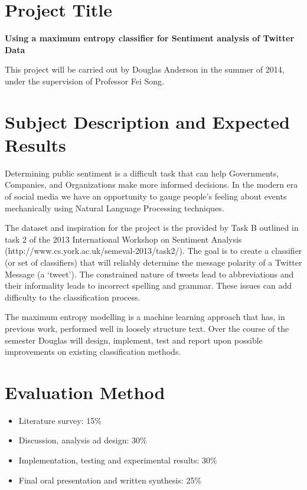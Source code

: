 \documentclass{article}
\begin{document}
\large
\thispagestyle{empty}

\section*{Project Title}

{\bf Using a maximum entropy classifier for Sentiment analysis of Twitter Data}

\quad

This project will be carried out by Douglas Anderson in the summer of 2014,
under the supervision of Professor Fei Song.

\section*{Subject Description and Expected Results}

Determining public sentiment is a difficult task that can help Governments,
Companies, and Organizations make more informed decisions. In the modern era of
social media we have an opportunity to gauge people's feeling about events
mechanically using Natural Language Processing techniques.

The dataset and inspiration for the project is the provided by Task B outlined
in task 2 of the 2013 International Workshop on Sentiment Analysis
(http://www.cs.york.ac.uk/semeval-2013/task2/). The goal is to create a
classifier (or set of classifiers) that will reliably determine the message
polarity of a Twitter Message (a `tweet'). The constrained nature of tweets
lead to abbreviations and their informality leads to incorrect spelling and
grammar. These issues can add difficulty to the classification process.

The maximum entropy modelling is a machine learning approach that has, in
previous work, performed well in loosely structure text. Over the course of the
semester Douglas will design, implement, test and report upon possible
improvements on existing classification methods.

\section*{Evaluation Method}

\begin{itemize}
    \item Literature survey: 15\%
    \item Discussion, analysis ad design: 30\%
    \item Implementation, testing and experimental results: 30\%
    \item Final oral presentation and written synthesis: 25\%
\end{itemize}
\end{document}
